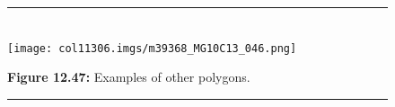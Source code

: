 	\begin{figure}[H] %
    \begin{center}
    \rule[.1in]{\figurerulewidth}{.005in} \\
        \label{m39368*uid93!!!underscore!!!media}\label{m39368*uid93!!!underscore!!!printimage}\texttt{[image: col11306.imgs/m39368\_MG10C13\_046.png]} %
      \vspace{2pt}
    \vspace{\rubberspace}\par \begin{cnxcaption}
	  \small \textbf{Figure 12.47: }Examples of other polygons.
	\end{cnxcaption}
    \vspace{.1in}
    \rule[.1in]{\figurerulewidth}{.005in} \\
    \end{center}
 \end{figure}       
      \label{m39368*eip-210}
